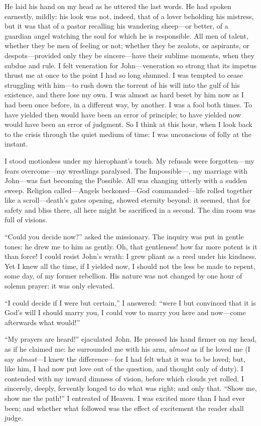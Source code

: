 He laid his hand on my head as he uttered the last words. He had spoken
earnestly, mildly: his look was not, indeed, that of a lover beholding
his mistress, but it was that of a pastor recalling his wandering
sheep---or better, of a guardian angel watching the soul for which he is
responsible. All men of talent, whether they be men of feeling or not;
whether they be zealots, or aspirants, or despots---provided only they
be sincere---have their sublime moments, when they subdue and rule. I
felt veneration for \St{} John---veneration so strong that its impetus
thrust me at once to the point I had so long shunned. I was tempted to
cease struggling with him---to rush down the torrent of his will into
the gulf of his existence, and there lose my own. I was almost as hard
beset by him now as I had been once before, in a different way, by
another. I was a fool both times. To have yielded then would have been
an error of principle; to have yielded now would have been an error of
judgment. So I think at this hour, when I look back to the crisis
through the quiet medium of time: I was unconscious of folly at the
instant.

I stood motionless under my hierophant's touch. My refusals were
forgotten---my fears overcome---my wrestlings paralysed. The
Impossible---\emph{\ie}, my marriage with \St{} John---was fast becoming
the Possible. All was changing utterly with a sudden sweep. Religion
called---Angels beckoned---God commanded---life rolled together like a
scroll---death's gates opening, showed eternity beyond: it seemed, that
for safety and bliss there, all here might be sacrificed in a second. 
The dim room was full of visions.

\enquote{Could you decide now?} asked the missionary. The inquiry was
put in gentle tones: he drew me to him as gently. Oh, that gentleness!
how far more potent is it than force! I could resist \St{} John's wrath:
I grew pliant as a reed under his kindness. Yet I knew all the time, if
I yielded now, I should not the less be made to repent, some day, of my
former rebellion. His nature was not changed by one hour of solemn
prayer: it was only elevated.

\enquote{I could decide if I were but certain,} I answered:
\enquote{were I but convinced that it is God's will I should marry you,
I could vow to marry you here and now---come afterwards what would!}

\enquote{My prayers are heard!} ejaculated \St{} John. He pressed his
hand firmer on my head, as if he claimed me: he surrounded me with his
arm, \emph{almost} as if he loved me (I say \emph{almost}---I knew the
difference---for I had felt what it was to be loved; but, like him, I
had now put love out of the question, and thought only of duty). I
contended with my inward dimness of vision, before which clouds yet
rolled. I sincerely, deeply, fervently longed to do what was right; and
only that. \enquote{Show me, show me the path!} I entreated of Heaven. 
I was excited more than I had ever been; and whether what followed was
the effect of excitement the reader shall judge.

